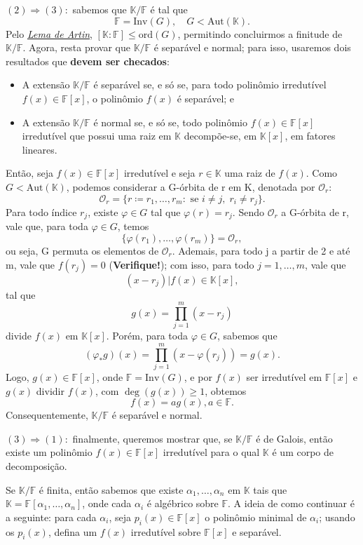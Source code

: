 \documentclass[../algebraIII_notes.tex]{subfiles}
\begin{document}
\begin{proof*}
	\((2)\Rightarrow (3):\) sabemos que \(\mathbb{K}/\mathbb{F}\) é tal que
	\[
		\mathbb{F} = \mathrm{Inv}(G),\quad G < \mathrm{Aut}(\mathbb{K}).
	\]
	Pelo \hyperlink{artin_lemma}{\textit{Lema de Artin}}, \([\mathbb{K}:\mathbb{F}]\leq \mathrm{ord}(G)\), permitindo concluirmos a finitude de \(\mathbb{K}/\mathbb{F}\).
	Agora, resta provar que \(\mathbb{K}/\mathbb{F}\) é separável e normal; para isso, usaremos dois resultados que \textbf{devem ser checados}:
	\begin{itemize}
		\item[1)] A extensão \(\mathbb{K}/\mathbb{F}\) é separável se, e só se, para todo polinômio irredutível \(f(x)\in \mathbb{F}[x]\), o polinômio \(f(x)\) é separável; e
		\item[2)] A extensão \(\mathbb{K}/\mathbb{F}\) é normal se, e só se, todo polinômio \(f(x)\in \mathbb{F}[x]\) irredutível que possui uma raiz em \(\mathbb{K}\) decompõe-se, em \(\mathbb{K}[x]\), em fatores lineares.
	\end{itemize}
	Então, seja \(f(x)\in \mathbb{F}[x]\) irredutível e seja \(r\in \mathbb{K}\) uma raiz de \(f(x)\). Como \(G < \mathrm{Aut}(\mathbb{K})\), podemos considerar a G-órbita de r em K, denotada por \(\mathcal{O}_{r}\):
	\[
		\mathcal{O}_{r} = \{r \coloneqq r_1, \dotsc , r_{m}: \text{ se }i\neq j,\; r_{i}\neq r_{j} \}.
	\]
	Para todo índice \(r_{j}\), existe \(\varphi \in G\) tal que \(\varphi (r) = r_{j}\). Sendo \(\mathcal{O}_{r}\) a G-órbita de r, vale que, para toda \(\varphi\in G\), temos
	\[
		\{\varphi (r_1), \dotsc , \varphi (r_{m})\} = \mathcal{O}_{r},
	\]
	ou seja, G permuta os elementos de \(\mathcal{O}_{r}\). Ademais, para todo j a partir de 2 e até m, vale que \(f(r_{j}) = 0\) (\textbf{Verifique!}); com isso, para todo \(j=1, \dotsc , m\), vale que
	\[
		(x-r_{j})|f(x)\in \mathbb{K}[x],
	\]
	tal que
	\[
		g(x) = \prod\limits_{j=1}^{m}(x-r_{j})
	\]
	divide \(f(x)\) em \(\mathbb{K}[x]\). Porém, para toda \(\varphi \in G\), sabemos que
	\[
		(\varphi_{*}g)(x) = \prod\limits_{j=1}^{m}(x-\varphi(r_{j})) = g(x).
	\]
	Logo, \(g(x)\in \mathbb{F}[x]\), onde \(\mathbb{F} = \mathrm{Inv}(G)\), e por \(f(x)\) ser irredutível em \(\mathbb{F}[x]\) e \(g(x)\) dividir \(f(x)\), com \(\deg{(g(x))}\geq 1\), obtemos
	\[
		f(x) = a g(x), a\in \mathbb{F}.
	\]
	Consequentemente, \(\mathbb{K}/\mathbb{F}\) é separável e normal.

	\((3)\Rightarrow (1):\) finalmente, queremos mostrar que, se \(\mathbb{K}/\mathbb{F}\) é de Galois, então existe um polinômio \(f(x)\in \mathbb{F}[x]\) irredutível para o qual \(\mathbb{K}\) é um corpo de decomposição.

	Se \(\mathbb{K}/\mathbb{F}\) é finita, então sabemos que existe \(\alpha_1, \dotsc , \alpha_{n}\) em \(\mathbb{K}\) tais que \(\mathbb{K} = \mathbb{F}[\alpha_1, \dotsc , \alpha_{n}]\), onde cada \(\alpha_{i}\) é algébrico sobre \(\mathbb{F}\). A ideia de como continuar é a seguinte: para cada \(\alpha_{i}\), seja \(p_{i}(x)\in \mathbb{F}[x]\) o polinômio minimal de \(\alpha_{i}\); usando os \(p_{i}(x)\), defina um \(f(x)\) irredutível sobre \(\mathbb{F}[x]\) e separável.
\end{proof*}
\end{document}
